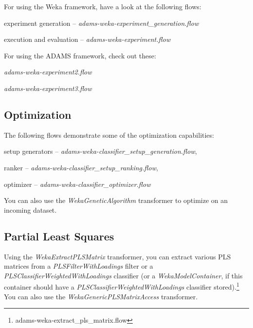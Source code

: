 For using the Weka framework, have a look at the following flows:
\begin{tight_itemize}
  \item experiment generation -- \textit{adams-weka-experiment\_generation.flow}
  \item execution and evaluation -- \textit{adams-weka-experiment.flow}
\end{tight_itemize}

For using the ADAMS framework, check out these:
\begin{tight_itemize}
  \item \textit{adams-weka-experiment2.flow}
  \item \textit{adams-weka-experiment3.flow}
\end{tight_itemize}

\subsection{Optimization}
The following flows demonstrate some of the optimization capabilities:
\begin{tight_itemize}
  \item setup generators -- \textit{adams-weka-classifier\_setup\_generation.flow},
  \item ranker -- \textit{adams-weka-classifier\_setup\_ranking.flow},
  \item optimizer -- \textit{adams-weka-classifier\_optimizer.flow}
\end{tight_itemize}

You can also use the \textit{WekaGeneticAlgorithm} transformer to optimize on an incoming
dataset.

\subsection{Partial Least Squares}
Using the \textit{WekaExtractPLSMatrix} transformer, you can extract various
PLS matrices from a \textit{PLSFilterWithLoadings} filter or a 
\textit{PLSClassifierWeightedWithLoadings} classifier (or a \textit{WekaModelContainer},
if this container should have a \textit{PLSClassifierWeightedWithLoadings} classifier 
stored).\footnote{adams-weka-extract\_pls\_matrix.flow}
You can also use the \textit{WekaGenericPLSMatrixAccess} transformer.